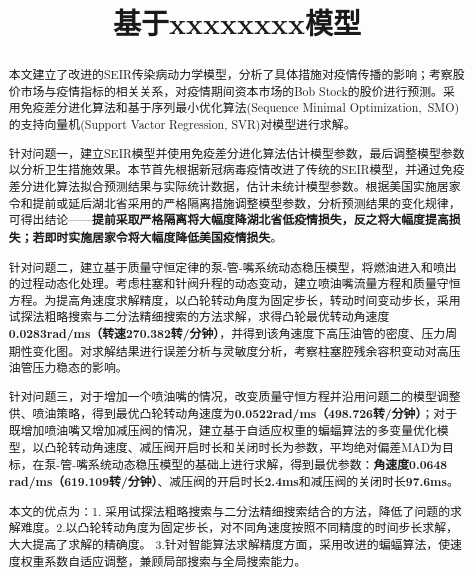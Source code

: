 \documentclass{whutmod}
\title{基于xxxxxxxx模型}
\begin{document}
	\maketitle
	\thispagestyle{empty}
	\begin{abstract}
		本文建立了改进的SEIR传染病动力学模型，分析了具体措施对疫情传播的影响；考察股价市场与疫情指标的相关关系，对疫情期间资本市场的Bob Stock的股价进行预测。采用免疫差分进化算法和基于序列最小优化算法(Sequence Minimal Optimization,\ SMO)的支持向量机(Support Vactor Regression, SVR)对模型进行求解。
		
		\vspace{6pt}	%
	
		针对问题一，建立SEIR模型并使用免疫差分进化算法估计模型参数，最后调整模型参数以分析卫生措施效果。本节首先根据新冠病毒疫情改进了传统的SEIR模型，并通过免疫差分进化算法拟合预测结果与实际统计数据，估计未统计模型参数。根据美国实施居家令和提前或延后湖北省采用的严格隔离措施调整模型参数，分析预测结果的变化规律，可得出结论——\textbf{提前采取严格隔离将大幅度降湖北省低疫情损失，反之将大幅度提高损失；若即时实施居家令将大幅度降低美国疫情损失}。
		\vspace{6pt}	%
		
		针对问题二，建立基于质量守恒定律的泵-管-嘴系统动态稳压模型，将燃油进入和喷出的过程动态化处理。考虑柱塞和针阀升程的动态变动，建立喷油嘴流量方程和质量守恒方程。为提高角速度求解精度，以凸轮转动角度为固定步长，转动时间变动步长，采用试探法粗略搜索与二分法精细搜索的方法求解，求得凸轮最优转动角速度\textbf{0.0283rad/ms（转速270.382转/分钟）}，并得到该角速度下高压油管的密度、压力周期性变化图。对求解结果进行误差分析与灵敏度分析，考察柱塞腔残余容积变动对高压油管压力稳态的影响。
		\vspace{6pt}	%
	
		针对问题三，对于增加一个喷油嘴的情况，改变质量守恒方程并沿用问题二的模型调整供、喷油策略，得到最优凸轮转动角速度为\textbf{0.0522rad/ms（498.726转/分钟）}；对于既增加喷油嘴又增加减压阀的情况，建立基于自适应权重的蝙蝠算法的多变量优化模型，以凸轮转动角速度、减压阀开启时长和关闭时长为参数，平均绝对偏差MAD为目标，在泵-管-嘴系统动态稳压模型的基础上进行求解，得到最优参数：\textbf{角速度0.0648 rad/ms（619.109转/分钟）}、减压阀的开启时长\textbf{2.4ms}和减压阀的关闭时长\textbf{97.6ms}。
		\vspace{6pt}	%
	
		本文的优点为：1. 采用试探法粗略搜索与二分法精细搜索结合的方法，降低了问题的求解难度。2.以凸轮转动角度为固定步长，对不同角速度按照不同精度的时间步长求解，大大提高了求解的精确度。 3.针对智能算法求解精度方面，采用改进的蝙蝠算法，使速度权重系数自适应调整，兼顾局部搜索与全局搜索能力。
		
	\end{abstract}
\end{document}
